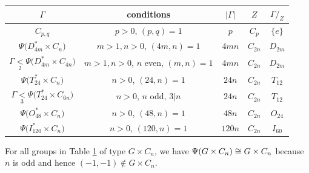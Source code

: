 \begin{table}
\begin{center}
\begin{tabular}{c||cccc}
\phantom{\Big|}\!\! $\Gamma$      & conditions & $|\Gamma|$ & $Z$ & $\Gamma/_Z$ \\
 \hline \hline
\phantom{\Big|}\!\! $C_{p,q}$ & $p>0$, $(p,q)=1$ & $p$ & $C_p$ & $\{e\}$ \\
\phantom{\Big|}\!\! $\Psi\big(D_{4m}^* \times C_n\big)$ & $m>1 ,n>0$, $(4m,n)=1$ & $4mn$ & $C_{2n}$ & $D_{2m}$ \\
\phantom{\Big|}\!\! $\Gamma \underset 2< \Psi\big(D_{4m}^* \times C_{4n}\big)$ & $m>1,n>0$, $n$ even, $(m,n)=1$ & $4mn$ & $C_{2n}$ & $D_{2m}$ \\
\phantom{\Big|}\!\! $\Psi\big(T_{24}^* \times C_n\big)$ & $n>0$, $(24,n)=1$ & $24n$ & $C_{2n}$ & $T_{12}$ \\
\phantom{\Big|}\!\! $\Gamma \underset 3< \Psi\big(T_{24}^* \times C_{6n}\big)$ & $n>0$, $n$ odd, $3|n$ & $24n$ & $C_{2n}$ & $T_{12}$ \\
\phantom{\Big|}\!\! $\Psi\big(O_{48}^* \times C_n\big)$ & $n>0$, $(48,n)=1$ & $48n$ & $C_{2n}$ & $O_{24}$ \\
\phantom{\Big|}\!\! $\Psi\big(I_{120}^* \times C_n\big)$ & $n>0$, $(120,n)=1$ & $120n$ & $C_{2n}$ & $I_{60}$
\end{tabular}
\vspace{.2 cm}
\label{finite:freely:table}
\end{center}
\end{table}

\begin{rem} \label{image:product:rem}
For all groups in Table \ref{finite:freely:table} of type $G\times C_n$, we have $\Psi(G\times C_n) \cong G\times C_n$ because $n$ is odd and hence $(-1,-1)\not\in G\times C_n$.
\end{rem}

